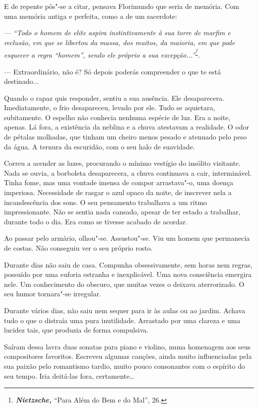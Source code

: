 E de repente pôs"-se a citar, pensava Florimundo que seria de memória.
Com uma memória antiga e perfeita, como a de um sacerdote:

--- \emph{``Todo o homem de elite aspira instintivamente à sua torre de
marfim e reclusão, em que se libertou da massa, dos muitos, da maioria,
em que pode esquecer a regra ``homem'', sendo ele próprio a sua
excepção...''}\textsuperscript{\emph{\footnote{\emph{\textbf{Nietzsche,
  }}``Para Além do Bem e do Mal'', 26.}}}\emph{.}

--- Extraordinário, não é? Só depois poderás compreender o que te está
destinado...

Quando o rapaz quis responder, sentiu a sua ausência. Ele desaparecera.
Imediatamente, o frio desapareceu, levado por ele. Tudo se aquietara,
subitamente. O espelho não conhecia nenhuma espécie de luz. Era a noite,
apenas. Lá fora, a existência da neblina e a chuva atestavam a
realidade. O odor de pétalas molhadas, que tinham um cheiro menos pesado
e atenuado pelo peso da água. A ternura da escuridão, com o seu halo de
suavidade.

Correu a acender as luzes, procurando o mínimo vestígio do insólito
visitante. Nada se ouvia, a borboleta desaparecera, a chuva continuava a
cair, interminável. Tinha fome, mas uma vontade imensa de compor
arrastava"-o, uma doença imperiosa. Necessidade de rasgar o azul opaco da
noite, de inscrever nela a incandescência dos sons. O seu pensamento
trabalhava a um ritmo impressionante. Não se sentia nada cansado, apesar
de ter estado a trabalhar, durante todo o dia. Era como se tivesse
acabado de acordar.

Ao passar pelo armário, olhou"-se. Assustou"-se. Viu um homem que
permanecia de costas. Não conseguiu ver o seu próprio rosto.

Durante dias não saiu de casa. Compunha obsessivamente, sem horas nem
regras, possuído por uma euforia estranha e inexplicável. Uma nova
consciência emergira nele. Um conhecimento do obscuro, que muitas vezes
o deixava aterrorizado. O seu humor tornara"-se irregular.

Durante vários dias, não saiu nem sequer para ir às aulas ou ao jardim.
Achava tudo o que o distraía uma pura inutilidade. Arrastado por uma
clareza e uma lucidez tais, que produzia de forma compulsiva.

Saíram dessa lavra duas sonatas para piano e violino, numa homenagem aos
seus compositores favoritos. Escreveu algumas canções, ainda muito
influenciadas pela sua paixão pelo romantismo tardio, muito pouco
consonantes com o espírito do seu tempo. Iria deitá-las fora,
certamente\ldots{}

